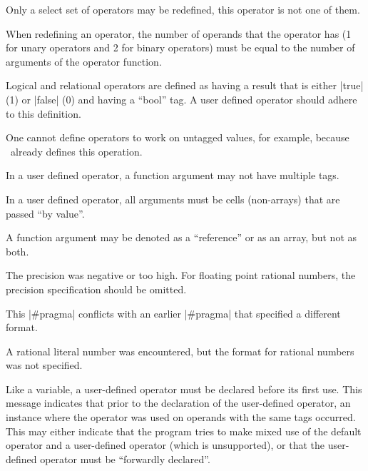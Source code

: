 {{ 
        Only a select set of operators may be redefined, this operator is not
        one of them.  %

 
        When redefining an operator, the number of operands that the operator
        has (1 for unary operators and 2 for binary operators) must be equal
        to the number of arguments of the operator function.

 
        Logical and relational operators are defined as having a result that is
        either |true| (1) or |false| (0) and having a ``bool'' tag. A
        user defined operator should adhere to this definition.

 
        One cannot define operators to work on untagged values, for example,
        because \Small\ already defines this operation.

 
        In a user defined operator, a function argument may not have multiple
        tags.

 
        In a user defined operator, all arguments must be cells (non-arrays)
        that are passed ``by value''.

 
        A function argument may be denoted as a ``reference'' or as an array,
        but not as both.

 
        The precision was negative or too high. For floating point rational
        numbers, the precision specification should be omitted.

 
        This |#pragma| conflicts with an earlier |#pragma| that specified
        a different format.

        A rational literal number was encountered, but the format for rational
        numbers was not specified.

        Like a variable, a user-defined operator must be declared before its
        first use. This message indicates that prior to the declaration of the
        user-defined operator, an instance where the operator was used on operands
        with the same tags occurred. This may either indicate that the program
        tries to make mixed use of the default operator and a user-defined
        operator (which is unsupported), or that the user-defined operator must
        be ``forwardly declared''.

}}
